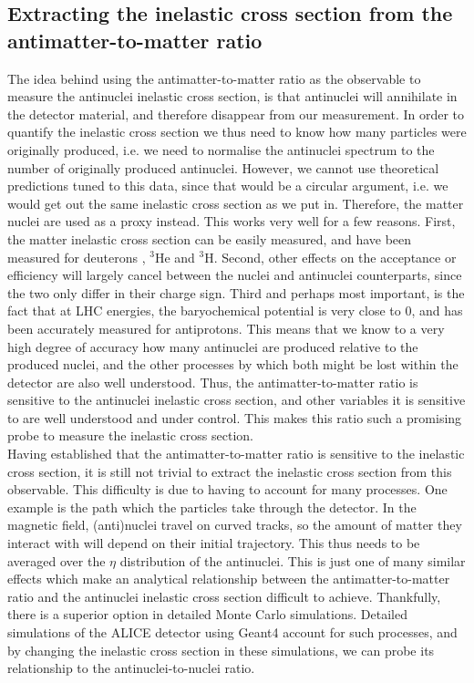 \subsection{Extracting the inelastic cross section from the antimatter-to-matter ratio}
The idea behind using the antimatter-to-matter ratio as the observable to measure the antinuclei inelastic cross section, is that antinuclei will annihilate in the detector material, and therefore disappear from our measurement. In order to quantify the inelastic cross section we thus need to know how many particles were originally produced, i.e. we need to normalise the antinuclei spectrum to the number of originally produced antinuclei. However, we cannot use theoretical predictions tuned to this data, since that would be a circular argument, i.e. we would get out the same inelastic cross section as we put in. Therefore, the matter nuclei are used as a proxy instead. This works very well for a few reasons. First, the matter inelastic cross section can be easily measured, and have been measured for deuterons \cite{}, $^3\mathrm{He}$\cite{} and $^3\mathrm{H}$\cite{}. Second, other effects on the  acceptance or efficiency will largely cancel between the nuclei and antinuclei counterparts, since the two only differ in their charge sign. Third and perhaps most important, is the fact that at LHC energies, the baryochemical potential is very close to 0, and has been accurately measured for antiprotons. This means that we know to a very high degree of accuracy how many antinuclei are produced relative to the produced nuclei, and the other processes by which both might be lost within the detector are also well understood. Thus, the antimatter-to-matter ratio is sensitive to the antinuclei inelastic cross section, and other variables it is sensitive to are well understood and under control. This makes this ratio such a promising probe to measure the inelastic cross section.\\

Having established that the antimatter-to-matter ratio is sensitive to the inelastic cross section, it is still not trivial to extract the inelastic cross section from this observable. This difficulty is due to having to account for many processes. One example is the path which the particles take through the detector. In the magnetic field, (anti)nuclei travel on curved tracks, so the amount of matter they interact with will depend on their initial trajectory. This thus needs to be averaged over the $\eta$ distribution of the antinuclei. This is just one of many similar effects which make an analytical relationship between the antimatter-to-matter ratio and the antinuclei inelastic cross section difficult to achieve. Thankfully, there is a superior option in detailed Monte Carlo simulations. Detailed simulations of the ALICE detector using Geant4 account for such processes, and by changing the inelastic cross section in these simulations, we can probe its relationship to the antinuclei-to-nuclei ratio.
